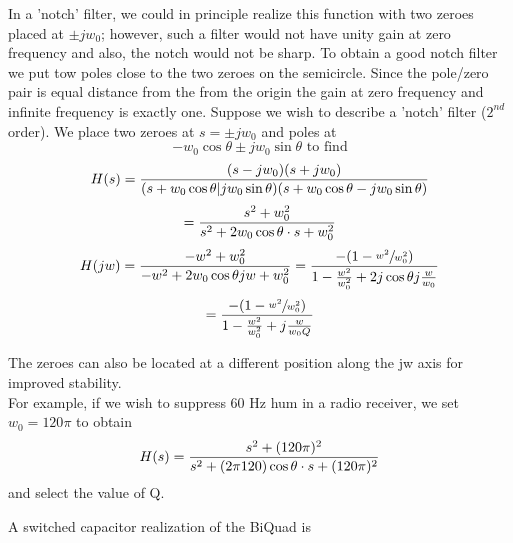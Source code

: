 \documentclass[11pt,fleqn]{book} %
\begin{document}
In a 'notch' filter, we could in principle realize this function with two zeroes placed at $\pm jw_0$; however, such a filter would not have unity gain at zero frequency and also, the notch would not be sharp. To obtain a good notch filter we put tow poles close to the two zeroes on the semicircle. Since the pole/zero pair is equal distance from the from the origin the gain at zero frequency and infinite frequency is exactly one. Suppose we wish to describe a 'notch' filter ($2^{nd}$ order). We place two zeroes at $s=\pm jw_0$ and poles at
$$-w_0\cos\theta\pm jw_0\sin\theta\text{ to find}$$
$$H(s)={(s-jw_0)(s+jw_0)\over(s+w_0\cos\theta|jw_0\sin\theta)(s+w_0\cos\theta-jw_0\sin\theta)}$$
$$={s^2+w_0^2\over s^2+2w_0\cos\theta\cdot s+w_0^2}$$
$$H(jw)={-w^2+w_0^2\over-w^2+2w_0\cos\theta jw+w_0^2}={-(1-\sfrac{w^2}{w_0^2})\over 1-{w^2\over w_0^2}+2j\cos\theta j{w\over w_0}}$$
$$={-(1-\sfrac{w^2}{w_0^2})\over 1-{w^2\over w_0^2}+j{w\over w_0Q}}$$

The zeroes can also be located at a different position along the jw axis for improved stability.\\
For example, if we wish to suppress 60 Hz hum in a radio receiver, we set $w_0=120\pi$ to obtain
$$H(s)={s^2+(120\pi)^2\over s^2+(2\pi120)\cos\theta\cdot s+(120\pi)^2}$$
and select the value of Q.

A switched capacitor realization of the BiQuad is
\end{document}
